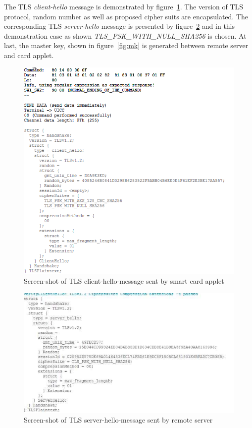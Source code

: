 The TLS \emph{client-hello} message is demonstrated by figure~\ref{fig:client-hello}. The version of TLS protocol, random number as well as proposed cipher suits are encapsulated.   The corresponding TLS \emph{server-hello} message is presented by figure~\ref{fig:server-hello} and in this demonstration case as shown \emph{TLS\_PSK\_WITH\_NULL\_SHA256} is chosen. At last, the master key, shown in figure~\ref{fig:mk} is generated between remote server and card applet.

\begin{figure}[!htb]
	\centering
	\includegraphics[width=1\textwidth]{Images/impl/client-hallo.png}
		\caption{Screen-shot of TLS client-hello-message sent by smart card applet}
	\label{fig:client-hello}
\end{figure}

\begin{figure}[!htb]
	\centering
	\includegraphics[width=1\textwidth]{Images/impl/ServerHallo.jpg}
		\caption{Screen-shot of TLS server-hello-message sent by remote server}
	\label{fig:server-hello}
\end{figure}

